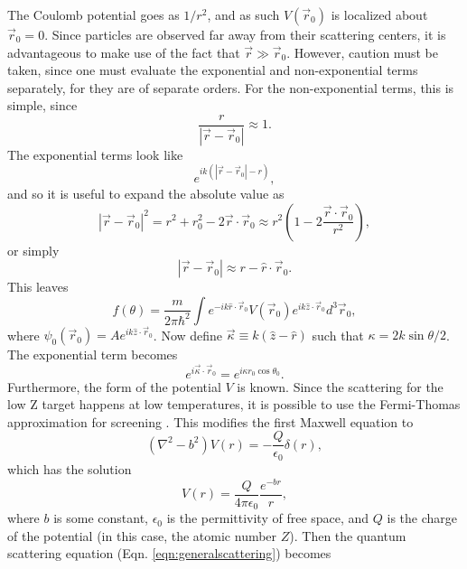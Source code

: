 The Coulomb potential goes as $1/r^2$, and as such $V(\vec{r}_0)$ is localized about $\vec{r}_0=0$. Since particles are observed far away from their scattering centers, it is advantageous to make use of the fact that $\vec{r} \gg \vec{r}_0$. However, caution must be taken, since one must evaluate the exponential and non-exponential terms separately, for they are of separate orders. For the non-exponential terms, this is simple, since
%
\begin{equation}\nonumber
\frac{r}{|\vec{r}-\vec{r}_0|}\approx1.
\end{equation}
%
The exponential terms look like
%
\begin{equation}\nonumber
e^{ik(|\vec{r}-\vec{r}_0|-r)},
\end{equation}
and so it is useful to expand the absolute value as
\begin{equation}\nonumber
|\vec{r}-\vec{r}_0|^2=r^2+r_0^2-2\vec{r}\cdot\vec{r}_0\approx r^2(1-2\frac{\vec{r}\cdot\vec{r}_0}{r^2}),
\end{equation}
%
or simply
%
\begin{equation} \nonumber |\vec{r}-\vec{r}_0|\approx r-\hat{r}\cdot\vec{r}_0. \end{equation}
%
This leaves
%
\begin{equation} \label{eqn:generalscattering}
f(\theta)=\frac{m}{2\pi\hbar^2}\int
e^{-ik\hat{r}\cdot\vec{r}_0}
V(\vec{r}_0)
e^{ik\hat{z}\cdot\vec{r}_0}
d^3\vec{r}_0,
\end{equation}
%
where $\psi_0(\vec{r}_0)=Ae^{ik\hat{z}\cdot\vec{r}_0}$.
Now define $\vec{\kappa}\equiv k(\hat{z}-\hat{r})$ such that $\kappa=2k\sin{\theta/2}$. The exponential term becomes
%
\begin{equation} \nonumber
e^{i\vec{\kappa}\cdot\vec{r}_0}=e^{i\kappa r_0\cos{\theta_0}}.
\end{equation}
Furthermore, the form of the potential $V$ is known. Since the scattering for the low Z target happens at low temperatures, it is possible to use the Fermi-Thomas approximation for screening \cite{ashcroft}. This modifies the first Maxwell equation to
\begin{equation} \nonumber
(\nabla^2-b^2)V(r)=-\frac{Q}{\epsilon_0}\delta(r),
\end{equation}
%
which has the solution
\begin{equation} \nonumber
V(r)=\frac{Q}{4\pi\epsilon_0}\frac{e^{-br}}{r},
\end{equation}
where $b$ is some constant, $\epsilon_0$ is the permittivity of free space, and $Q$ is the charge of the potential (in this case, the atomic number $Z$). Then the quantum scattering equation (Eqn. \ref{eqn:generalscattering}) becomes
